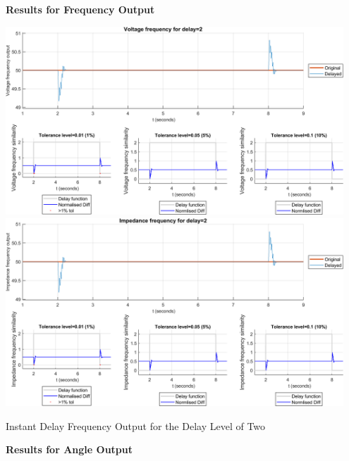{\newpage \textbf{Results for Frequency Output}
\begin{floatingfigure}[p]{\textwidth}
    \includegraphics[width=0.95\textwidth]{PMUsim-figures/DelayOf_2/Instant_vFrequency.png}    
    \label{fig:PMUsim_Two_vFrequency}
    \includegraphics[width=0.95\textwidth]{PMUsim-figures/DelayOf_2/Instant_iFrequency.png}    
    \label{fig:PMUsim_Two_Frequency}
    \caption{Instant Delay Frequency Output for the Delay Level of Two}
\end{floatingfigure}


\newpage \textbf{Results for Angle Output}


}
